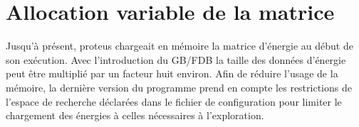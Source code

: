 \section{Allocation variable de la matrice}

Jusqu'à présent, proteus chargeait en mémoire la matrice d'énergie au début de son exécution. Avec l'introduction du GB/FDB la taille des données d'énergie peut être multiplié par un facteur huit environ. Afin de réduire l'usage de la mémoire, la dernière version du programme prend en compte les restrictions de l'espace de recherche déclarées dans le fichier de configuration pour limiter le chargement des énergies à celles nécessaires à l'exploration.  

\clearpage


